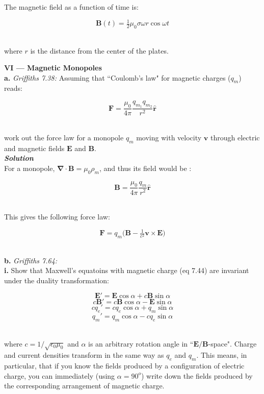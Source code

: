 \documentclass[14pt]{extarticle}
\renewcommand{\v}[1]{{\bm #1}}
\newcommand{\hv}[1]{\hat{\bm{#1}}}
\newcommand{\bfit}[1]{\textbf{\textit{#1}}}
\renewcommand{\div}{\boldsymbol \nabla \cdot}
\newcommand{\eo}{\epsilon_0}
\newcommand{\muo}{\mu_0}
\begin{document}
The magnetic field as a function of time is:

$$\v B(t) = \tfrac 12 \muo \sigma \omega r \cos\omega t$$ \ 

where $r$ is the distance from the center of the plates. \\ 







\hrulefill 

\hfill 

{\LARGE \bf VI --- Magnetic Monopoles} \\ 

{\Large \bf a.} {\it Griffiths 7.38:} Assuming that ``Coulomb's law" for magnetic charges ($q_m$) reads:

$$\v F = \frac{\muo}{4\pi} \frac{q_{m_1} q_{m_2}}{r^2} \hv r$$ \ 

work out the force law for a monopole $q_m$ moving with  velocity $\v v$ through electric and magnetic fields $\v E$ and $\v B$. \\ 

{\bfit{Solution}} \\ 

For a monopole, $\div \v B = \muo \rho_m$, and thus its field would be :

$$\v B = \frac{\muo}{4\pi} \frac{q_m}{r^2} \hv r$$ \ 

This gives the following force law:

$$\v F = q_m \big( \v B - \tfrac{1}{c^2} \v v \times \v E \big)$$ \ 





\dotfill 

\hfill 

{\Large \bf b.} {\it Griffiths 7.64:} \\ 

{\bf i.} Show that Maxwell's equatoins  with magnetic charge (eq 7.44) are invariant under the duality transformation:

$$\v E' = \v E\cos\alpha + c\v B\sin\alpha$$
$$c\v B' = c\v B\cos\alpha - \v E\sin\alpha$$
$$cq_e' = cq_e \cos\alpha + q_m\sin\alpha$$
$$q_m' = q_m\cos\alpha  -  cq_e\sin\alpha$$ \ 

where $c = 1/\sqrt{\eo\muo}$ and $\alpha$ is an arbitrary rotation angle in ``$\v E/\v B$-space". Charge and current densities transform in the same way as $q_e$ and $q_m$. This means, in particular, that if you know the fields produced by a configuration of electric charge, you can immediately (using $\alpha = 90^o$) write down the fields produced by the corresponding arrangement of magnetic charge. \\ 
\end{document}
